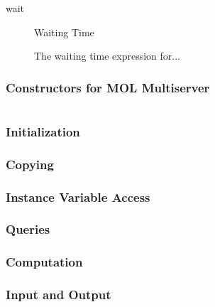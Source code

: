 \begin{description}
\item[wait] \texonly{---} Waiting Time\\

  The waiting time expression for...

\end{description}

\subsubsection{Constructors for MOL Multiserver}

\begin{verbatim}

\end{verbatim}

\subsubsection{Initialization}
\subsubsection{Copying}
\subsubsection{Instance Variable Access}
\subsubsection{Queries}
\subsubsection{Computation}
\subsubsection{Input and Output}


